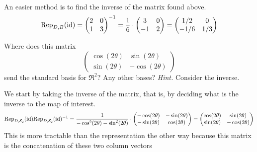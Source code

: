\begin{exercises}
\begin{answer}
\begin{align*}
      \end{align*}
      An easier method is to find the inverse of the matrix found above.
      \begin{equation*}
        {\rm Rep}_{D,B}(\mbox{id})
        =\begin{pmatrix}
          2  &0  \\
          1  &3  
        \end{pmatrix}^{-1}
        =\frac{1}{6}\cdot\begin{pmatrix}
          3  &0  \\
          -1  &2  
        \end{pmatrix}
        =\begin{pmatrix}
           1/2  &0  \\
          -1/6  &1/3
         \end{pmatrix}
      \end{equation*}
    \end{answer}
  \item 
    Where does this matrix
    \begin{equation*}
        \begin{pmatrix}
           \cos(2\theta)   &\sin(2\theta)   \\
           \sin(2\theta)   &-\cos(2\theta)
        \end{pmatrix}
    \end{equation*}
    send the standard basis for \( \Re^2 \)?
    Any other bases?
    \textit{Hint.}
    Consider the inverse.
    \begin{answer} 
      We start by taking
      the inverse of the matrix, that is, by deciding what is the inverse to
      the map of interest.
      \begin{equation*}
        {\rm Rep}_{D,{\cal E}_2}(\mbox{id})
        {\rm Rep}_{D,{\cal E}_2}(\mbox{id})^{-1}
        =\frac{1}{-\cos^2(2\theta)-\sin^2(2\theta)}\cdot\begin{pmatrix}
           -\cos(2\theta)   &-\sin(2\theta)  \\
           -\sin(2\theta)   &\cos(2\theta)
        \end{pmatrix}
        =\begin{pmatrix}
           \cos(2\theta)   &\sin(2\theta)  \\
           \sin(2\theta)   &-\cos(2\theta)
        \end{pmatrix}
      \end{equation*}
      This is more tractable than the representation the other way
      because this matrix is the concatenation of these two column vectors

\end{answer}
\end{exercises}
